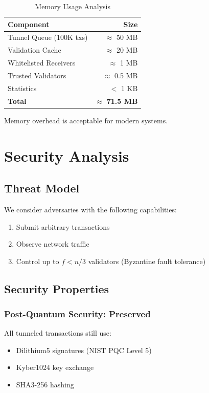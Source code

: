 \documentclass[11pt,a4paper]{article}
\begin{document}
\begin{table}[h]
\centering
\caption{Memory Usage Analysis}
\begin{tabular}{@{}lr@{}}
\toprule
\textbf{Component} & \textbf{Size} \\
\midrule
Tunnel Queue (100K txs) & $\approx$ 50 MB \\
Validation Cache & $\approx$ 20 MB \\
Whitelisted Receivers & $\approx$ 1 MB \\
Trusted Validators & $\approx$ 0.5 MB \\
Statistics & $<$ 1 KB \\
\midrule
\textbf{Total} & $\approx$ \textbf{71.5 MB} \\
\bottomrule
\end{tabular}
\end{table}

Memory overhead is acceptable for modern systems.

\section{Security Analysis}

\subsection{Threat Model}

We consider adversaries with the following capabilities:
\begin{enumerate}
    \item Submit arbitrary transactions
    \item Observe network traffic
    \item Control up to $f < n/3$ validators (Byzantine fault tolerance)
\end{enumerate}

\subsection{Security Properties}

\subsubsection{Post-Quantum Security: Preserved}
All tunneled transactions still use:
\begin{itemize}
    \item Dilithium5 signatures (NIST PQC Level 5)
    \item Kyber1024 key exchange
    \item SHA3-256 hashing
\end{itemize}
\end{document}

